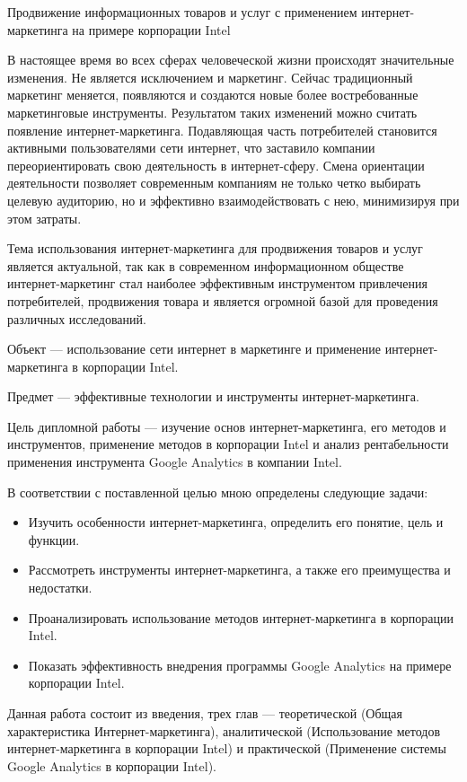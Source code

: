 \documentclass[a4paper,english,russian]{G2-105}
\begin{document}
\newpage
\par Продвижение информационных товаров и услуг с применением интернет-маркетинга на примере корпорации Intel
\tableofcontents
\newpage

\par В настоящее время во всех сферах человеческой жизни происходят значительные изменения. Не является исключением и маркетинг. Сейчас традиционный маркетинг меняется, появляются и создаются новые более востребованные маркетинговые инструменты. Результатом таких изменений можно считать появление интернет-маркетинга. Подавляющая часть потребителей становится активными пользователями сети интернет, что заставило компании переориентировать свою деятельность в интернет-сферу. Смена ориентации деятельности позволяет современным компаниям не только четко выбирать целевую аудиторию, но и эффективно взаимодействовать с нею, минимизируя при этом затраты.
\par Тема использования интернет-маркетинга для продвижения товаров и услуг является актуальной, так как в современном информационном обществе интернет-маркетинг стал наиболее эффективным инструментом привлечения потребителей, продвижения товара и является огромной базой для проведения различных исследований.
\par Объект --- использование сети интернет в маркетинге и применение интернет-маркетинга в корпорации Intel.
\par Предмет --- эффективные технологии и инструменты интернет-маркетинга.
\par Цель дипломной работы --- изучение основ интернет-маркетинга, его методов и инструментов, применение методов в корпорации Intel и анализ рентабельности применения инструмента Google Analytics в компании Intel.
\par В соответствии с поставленной целью мною определены следующие задачи:
\begin{itemize}
	\item Изучить особенности интернет-маркетинга, определить его понятие, цель и функции.
	\item Рассмотреть инструменты интернет-маркетинга, а также его преимущества и недостатки.
	\item Проанализировать использование методов интернет-маркетинга в корпорации Intel.
	\item Показать эффективность внедрения программы Google Analytics на примере корпорации Intel.
\end{itemize}
\par Данная работа состоит из введения, трех глав --- теоретической (Общая характеристика Интернет-маркетинга), аналитической (Использование методов интернет-маркетинга в корпорации Intel) и практической (Применение системы Google Analytics в корпорации Intel).
\end{document}
